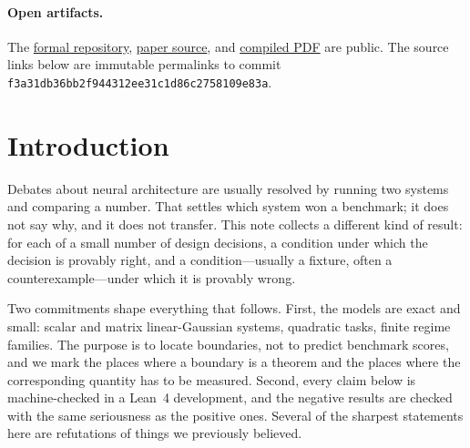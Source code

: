 \documentclass[11pt]{article}
\newcommand{\code}[1]{\texttt{#1}}
\newcommand{\formalcommit}{f3a31db36bb2f944312ee31c1d86c2758109e83a}
\begin{document}
\begin{abstract}
union has large exclusive marginals along both axes; prospective PC leads the aggregate
rule portfolio but not every carrier--world cell, and BP remains faster.
The experiment therefore supports composition and interaction, not a universal winner. A separate
dependent-proof screen then starts every credit rule at update zero: prospective PC
reproducibly departs from BP and contributes held-out marginal solutions, while BP keeps
higher total coverage. This motivates cost-aware composition rather than winner-take-all
selection.
A separate two-round fresh-start audit then shows why architecture and credit must be
analyzed relationally: the Unified PC arm improves target coverage over its BP control
while using fewer fresh program identities, and the advantage reverses when one
high-degree reused program is removed.
\end{abstract}

\paragraph{Open artifacts.}
The \href{https://github.com/zariuq/MeTTapedia}{formal repository},
\href{https://github.com/zariuq/MeTTapedia/blob/main/papers/neural_networks.tex}{paper
source}, and
\href{https://github.com/zariuq/MeTTapedia/blob/main/papers/neural_networks.pdf}{compiled
PDF} are public. The source links below are immutable permalinks to commit
\code{\formalcommit}.

\section{Introduction}
\label{sec:intro}

Debates about neural architecture are usually resolved by running two systems and
comparing a number. That settles which system won a benchmark; it does not say why, and it
does not transfer. This note collects a different kind of result: for each of a small
number of design decisions, a condition under which the decision is provably right, and a
condition---usually a fixture, often a counterexample---under which it is provably wrong.

Two commitments shape everything that follows. First, the models are exact and small:
scalar and matrix linear-Gaussian systems, quadratic tasks, finite regime families. The
purpose is to locate boundaries, not to predict benchmark scores, and we mark the places
where a boundary is a theorem and the places where the corresponding quantity has to be
measured. Second, every claim below is machine-checked in a Lean~4 development, and the
negative results are checked with the same seriousness as the positive ones. Several of
the sharpest statements here are refutations of things we previously believed.
\end{document}
